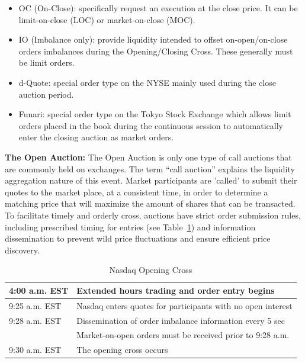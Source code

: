 \begin{itemize}
\item  OC (On-Close): specifically request an execution at the close price. It can be limit-on-close (LOC) or market-on-close (MOC).
\item  IO (Imbalance only): provide liquidity intended to offset on-open/on-close orders imbalances during the Opening/Closing Cross. These generally must be limit orders.
\item  d-Quote: special order type on the NYSE mainly used during the close auction period.
\item  Funari: special order type on the Tokyo Stock Exchange which allows limit orders placed in the book during the continuous session to automatically enter the closing auction as market orders.
\end{itemize} 



\noindent\textbf{The Open Auction:} The Open Auction is only one type of call auctions that are commonly held on exchanges. The term ``call auction'' explains the liquidity aggregation nature of this event. Market participants are 'called' to submit their quotes to the market place, at a consistent time, in order to determine a matching price that will maximize the amount of shares that can be transacted. To facilitate timely and orderly cross, auctions have strict order submission rules, including prescribed timing for entries (see Table~\ref{tab:NASDAQopen}) and information dissemination to prevent wild price fluctuations and ensure efficient price discovery.

\begin{table}[!ht]
   \centering
   \caption{Nasdaq Opening Cross\label{tab:NASDAQopen}}
   \begin{tabular}{ll} 
	4:00 a.m. EST & Extended hours trading and order entry begins  \\ \hline
	9:25 a.m. EST & Nasdaq enters quotes for participants with no open interest \\ \hline
	9:28 a.m. EST & Dissemination of order imbalance information every 5 sec  \\ 
	 & Market-on-open orders must be received prior to 9:28 a.m.   \\ \hline	
	9:30 a.m. EST & The opening cross occurs		
   \end{tabular}
\end{table}	


